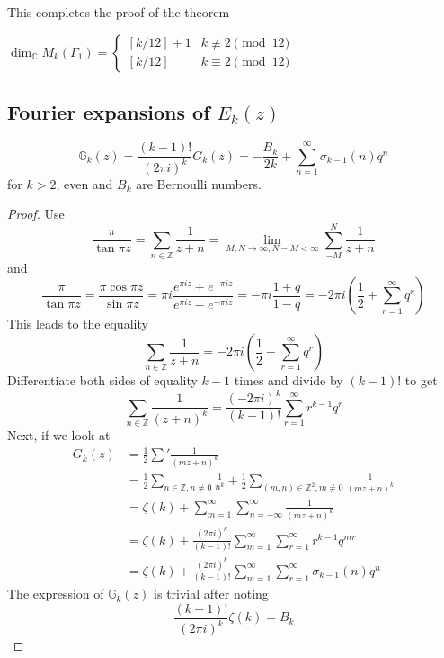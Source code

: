 \documentclass[oneside, 12pt]{scrbook}
\newcommand{\CC}{\mathbb C}
\newcommand{\ZZ}{\mathbb Z}
\theoremstyle{theorem}
\begin{document}
This completes the proof of the theorem 
\begin{theorem}
$\dim_{\CC} M_{k} (\Gamma_{1}) = \begin{cases}[k/12]+1 & k\not \equiv 2\pmod{12} \\ [k/12] & k \equiv 2\pmod{12} \end{cases} $
\end{theorem}



\subsection{Fourier expansions of $E_{k}(z)$}

\begin{proposition}[DS, Exercise 1.1.7]
$$\mathbb{G}_{k}(z) = \frac{(k-1)!}{(2 \pi i)^k} G_{k}(z) = -\frac{B_{k}}{2k} + \sum_{n=1}^{\infty} \sigma_{k-1}(n)q^n$$ for $k>2$, even and $B_{k}$ are Bernoulli numbers.
\end{proposition}

\begin{proof}
Use $$\frac{\pi}{\tan \pi z} = \sum_{n \in \ZZ} \frac{1}{z+n} = \lim_{M,N \rightarrow \infty , N-M < \infty} \sum_{-M}^{N} \frac{1}{z+n}$$ and 
$$\frac{\pi}{\tan \pi z} = \frac{\pi \cos \pi z}{\sin \pi z} = \pi i \frac{e^{\pi i z} + e^{-\pi i z}}{e^{\pi i z} - e^{-\pi i z}} = - \pi i \frac{1+q}{1-q} = - 2 \pi i \left( \frac{1}{2} + \sum_{r=1}^{\infty} q^r \right)$$ This leads to the equality 
$$\sum_{n\in \ZZ}\frac{1}{z+n} = -  2 \pi i \left( \frac{1}{2} + \sum_{r=1}^{\infty} q^r \right)$$
Differentiate both sides of equality $k-1$ times and divide by $(k-1)!$ to get $$\sum_{n \in \ZZ}\frac{1}{(z+n)^k} = \frac{(-2 \pi i)^k}{(k-1)!} \sum_{r=1}^{\infty} r^{k-1}q^r$$
Next, if we look at 
\begin{align*}
G_{k}(z) &= \frac{1}{2} \sum' \frac{1}{(mz+n)^k} \\
&= \frac{1}{2} \sum_{n \in \ZZ , n \neq 0} \frac{1}{n^k} + \frac{1}{2} \sum_{(m,n) \in \ZZ^2 , m \neq 0} \frac{1}{(mz + n)^k} \\
&= \zeta(k) + \sum_{m=1}^{\infty} \sum_{n=-\infty}^{\infty} \frac{1}{(mz+n)^k} \\
&= \zeta(k) + \frac{(2 \pi i)^k}{(k-1)!} \sum_{m=1}^{\infty} \sum_{r=1}^{\infty} r^{k-1} q^{mr} \\
&= \zeta(k) + \frac{(2 \pi i)^k}{(k-1)!} \sum_{m=1}^{\infty} \sum_{r=1}^{\infty} \sigma_{k-1}(n) q^{n}
\end{align*}
The expression of $\mathbb{G}_{k}(z)$ is trivial after noting $$\frac{(k-1)!}{(2 \pi i)^k} \zeta(k) = B_{k}$$
\end{proof} 
\end{document}
